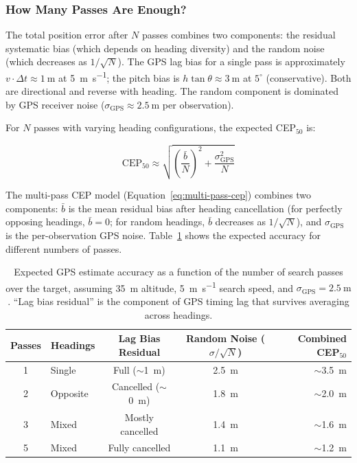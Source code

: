 \subsubsection{How Many Passes Are Enough?}

The total position error after $N$ passes combines two components: the residual systematic bias (which depends on heading diversity) and the random noise (which decreases as $1/\sqrt{N}$).  The GPS lag bias for a single pass is approximately $v \cdot \Delta t \approx \SI{1}{\metre}$ at \SI{5}{\metre\per\second}; the pitch bias is $h\tan\theta \approx \SI{3}{\metre}$ at $5^{\circ}$ (conservative).  Both are directional and reverse with heading.  The random component is dominated by GPS receiver noise ($\sigma_\mathrm{GPS} \approx \SI{2.5}{\metre}$ per observation).

For $N$ passes with varying heading configurations, the expected CEP$_{50}$ is:

\begin{equation}\label{eq:multi-pass-cep}
  \mathrm{CEP}_{50} \approx \sqrt{\left(\frac{\bar{b}}{N}\right)^2 + \frac{\sigma_\mathrm{GPS}^2}{N}}
\end{equation}

\noindent The multi-pass CEP model (Equation~\ref{eq:multi-pass-cep}) combines two components: $\bar{b}$ is the mean residual bias after heading cancellation (for perfectly opposing headings, $\bar{b} = 0$; for random headings, $\bar{b}$ decreases as $1/\sqrt{N}$), and $\sigma_\mathrm{GPS}$ is the per-observation GPS noise.  Table~\ref{tab:pass-accuracy} shows the expected accuracy for different numbers of passes.

\begin{table}[ht]
  \centering
  \caption{Expected GPS estimate accuracy as a function of the number of search passes over the target, assuming \SI{35}{\metre} altitude, \SI{5}{\metre\per\second} search speed, and $\sigma_\mathrm{GPS} = \SI{2.5}{\metre}$.  ``Lag bias residual'' is the component of GPS timing lag that survives averaging across headings.}
  \label{tab:pass-accuracy}
  \begin{tabular}{clccr}
    \toprule
    \textbf{Passes} & \textbf{Headings} & \textbf{Lag Bias Residual} & \textbf{Random Noise ($\sigma/\sqrt{N}$)} & \textbf{Combined CEP$_{50}$} \\
    \midrule
    1 & Single              & Full ($\sim$\SI{1}{\metre})       & \SI{2.5}{\metre} & $\sim$\SI{3.5}{\metre} \\
    2 & Opposite            & Cancelled ($\sim$\SI{0}{\metre})  & \SI{1.8}{\metre} & $\sim$\SI{2.0}{\metre} \\
    3 & Mixed               & Mostly cancelled                  & \SI{1.4}{\metre} & $\sim$\SI{1.6}{\metre} \\
    5 & Mixed               & Fully cancelled                   & \SI{1.1}{\metre} & $\sim$\SI{1.2}{\metre} \\
    \bottomrule
  \end{tabular}
\end{table}

